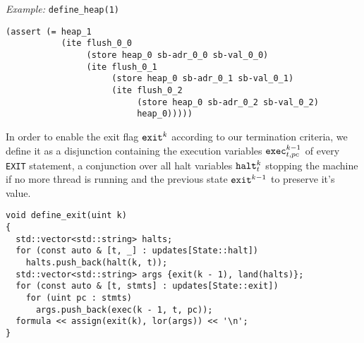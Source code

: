 \noindent
\emph{Example:} \lstinline[style=c++]{define_heap(1)}

\begin{lstlisting}[language=smtlib]
(assert (= heap_1
           (ite flush_0_0
                (store heap_0 sb-adr_0_0 sb-val_0_0)
                (ite flush_0_1
                     (store heap_0 sb-adr_0_1 sb-val_0_1)
                     (ite flush_0_2
                          (store heap_0 sb-adr_0_2 sb-val_0_2)
                          heap_0)))))
\end{lstlisting}


%
%
%
%

\noindent
In order to enable the exit flag $\texttt{exit}^k$ according to our termination criteria, we define it as a disjunction containing the execution variables $\texttt{exec}^{k - 1}_{t, pc}$ of every \lstinline[language={[concubine]Assembler}]{EXIT} statement, a conjunction over all halt variables $\texttt{halt}^k_t$ stopping the machine if no more thread is running and the previous state $\texttt{exit}^{k - 1}$ to preserve it's value.

\begin{lstlisting}[style=c++]
void define_exit(uint k)
{
  std::vector<std::string> halts;
  for (const auto & [t, _] : updates[State::halt])
    halts.push_back(halt(k, t));
  std::vector<std::string> args {exit(k - 1), land(halts)};
  for (const auto & [t, stmts] : updates[State::exit])
    for (uint pc : stmts)
      args.push_back(exec(k - 1, t, pc));
  formula << assign(exit(k), lor(args)) << '\n';
}
\end{lstlisting}

